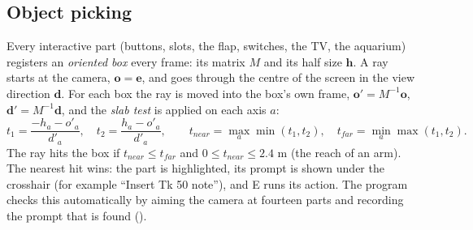 \subsection{Object picking}
Every interactive part (buttons, slots, the flap, switches, the TV, the aquarium) registers an \emph{oriented box}
every frame: its matrix $M$ and its half size $\mathbf{h}$. A ray starts at the camera, $\mathbf{o}=\mathbf{e}$, and goes
through the centre of the screen in the view direction $\mathbf{d}$. For each box the ray is moved into the box's own
frame, $\mathbf{o}'=M^{-1}\mathbf{o}$, $\mathbf{d}'=M^{-1}\mathbf{d}$, and the \emph{slab test} is applied on each axis $a$:
\[
t_1=\frac{-h_a-o'_a}{d'_a},\quad t_2=\frac{h_a-o'_a}{d'_a},\qquad
t_{near}=\max_a\min(t_1,t_2),\quad t_{far}=\min_a\max(t_1,t_2).
\]
The ray hits the box if $t_{near}\le t_{far}$ and $0\le t_{near}\le 2.4$ m (the reach of an arm). The nearest hit wins: the
part is highlighted, its prompt is shown under the crosshair (for example ``Insert Tk 50 note''), and E runs its
action. The program checks this automatically by aiming the camera at fourteen parts and recording the prompt that
is found ().


